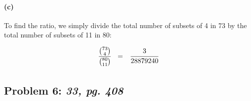 \documentclass[a4paper]{article}
\begin{document}
\paragraph{(c)} To find the ratio, we simply divide the total number of subsets of 4 in 73 by the total number of subsets of 11 in 80:

\begin{equation}
\begin{array}{rll}
\cfrac{{73 \choose 4}}{{80 \choose 11}} & = & \cfrac{3}{28879240} \\[.15in]
\end{array}
\end{equation}

\subsection*{Problem 6: \textit{33, pg. 408}}
\end{document}
